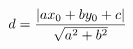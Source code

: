 \documentclass[preview]{standalone}
\begin{document}
\begin{align*}
\special{dvisvgm:raw <g id='unique000'>}d = \frac{|ax_0 + by_0 + c|}{\sqrt{a^2 + b^2}}\special{dvisvgm:raw </g>}
\end{align*}
\end{document}
